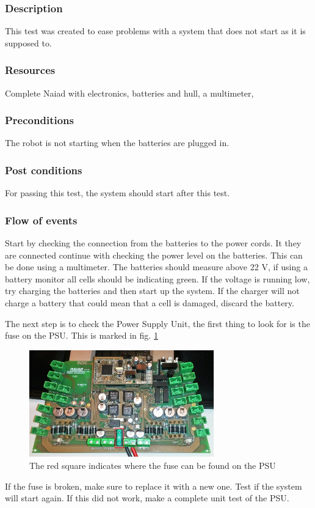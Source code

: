 \documentclass[10pt,a4paper]{article}
\begin{document}
\subsubsection*{Description}
This test was created to ease problems with a system that does not start as it is supposed to. 
\subsubsection*{Resources}
Complete Naiad with electronics, batteries and hull, a multimeter,
\subsubsection*{Preconditions}
The robot is not starting when the batteries are plugged in. 
\subsubsection*{Post conditions}
For passing this test, the system should start after this test. 
\subsubsection*{Flow of events}
Start by checking the connection from the batteries to the power cords. It they are connected continue with checking the power level on the batteries. This can be done using a multimeter. The batteries should measure above 22 V, if using a battery monitor all cells should be indicating green. If the voltage is running low, try charging the batteries and then start up the system. If the charger will not charge a battery that could mean that a cell is damaged, discard the battery. 

The next step is to check the Power Supply Unit, the first thing to look for is the fuse on the PSU. This is marked in fig. \ref{PSU_fuse}
\begin{figure}[!ht]
	\begin{center}
		\includegraphics[width=80mm]{powerboard_fuse.jpg}
		\caption{The red square indicates where the fuse can be found on the PSU}
		\label{PSU_fuse}
	\end{center}
\end{figure}
If the fuse is broken, make sure to replace it with a new one. Test if the system will start again. If this did not work, make a complete unit test of the PSU. 
\end{document}
